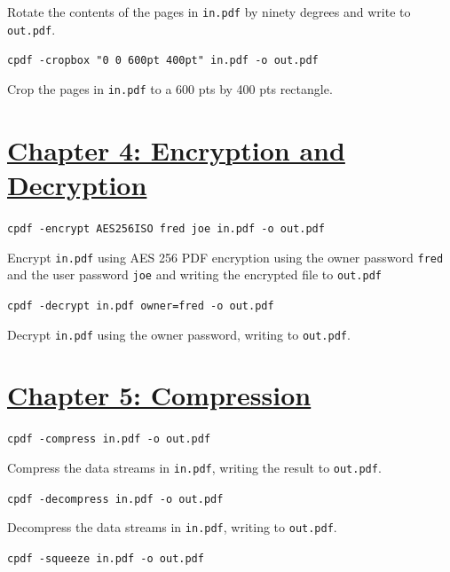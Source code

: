 \documentclass{book}
\begin{document}
\noindent Rotate the contents of the pages in \texttt{in.pdf} by ninety degrees and write to \texttt{out.pdf}.

\begin{framed}\noindent\texttt{cpdf -cropbox "0 0 600pt 400pt" in.pdf -o out.pdf}\end{framed}

\noindent Crop the pages in \texttt{in.pdf} to a 600 pts by 400 pts rectangle.


\section*{\hyperref[chap:4]{Chapter 4: Encryption and Decryption}}

\begin{framed}\noindent\texttt{cpdf -encrypt AES256ISO fred joe in.pdf -o out.pdf}\end{framed}

\noindent Encrypt \texttt{in.pdf} using AES 256 PDF encryption using the owner password \texttt{fred} and the user password \texttt{joe} and writing the encrypted file to \texttt{out.pdf}

\begin{framed}\noindent\texttt{cpdf -decrypt in.pdf owner=fred -o out.pdf}\end{framed}

\noindent Decrypt \texttt{in.pdf} using the owner password, writing to \texttt{out.pdf}.


\section*{\hyperref[chap:5]{Chapter 5: Compression}}

\begin{framed}\noindent\texttt{cpdf -compress in.pdf -o out.pdf}\end{framed}

\noindent Compress the data streams in \texttt{in.pdf}, writing the result to \texttt{out.pdf}.

\begin{framed}\noindent\texttt{cpdf -decompress in.pdf -o out.pdf}\end{framed}

\noindent Decompress the data streams in \texttt{in.pdf}, writing to \texttt{out.pdf}.

\begin{framed}\noindent\texttt{cpdf -squeeze in.pdf -o out.pdf}\end{framed}
\end{document}
